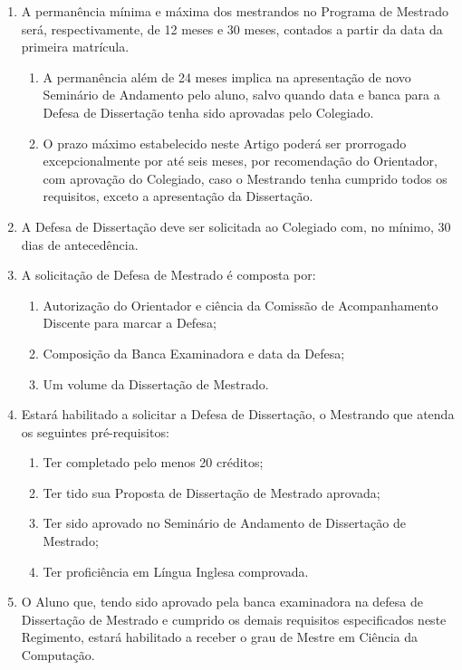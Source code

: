 \documentclass{article}
\newcommand{\grupoMenor}{Colegiado\xspace}
\begin{document}
\begin{enumerate}
	\item A permanência mínima e máxima dos mestrandos no Programa de Mestrado será, respectivamente, de 12 meses e 30 meses, contados a partir da data da primeira matrícula.
	\begin{enumerate}
		\item A permanência além de 24 meses implica na apresentação de novo Seminário de Andamento pelo aluno, salvo quando data e banca para a Defesa de Dissertação tenha sido aprovadas pelo \grupoMenor.	
		\item O prazo máximo estabelecido neste Artigo poderá ser prorrogado excepcionalmente por até seis meses, por recomendação do Orientador, com aprovação do \grupoMenor, caso o Mestrando tenha cumprido todos os requisitos, exceto a apresentação da Dissertação.
	\end{enumerate}

	\item A Defesa de Dissertação deve ser solicitada ao \grupoMenor com, no mínimo, 30 dias de antecedência. 
	\item A solicitação de Defesa de Mestrado é composta por:
    \begin{enumerate}[label=\Roman*]
        \item Autorização do Orientador e ciência da Comissão de Acompanhamento Discente para marcar a Defesa;
        \item Composição da Banca Examinadora e data da Defesa;
        \item Um volume da Dissertação de Mestrado.
    \end{enumerate}
	\item Estará habilitado a solicitar a Defesa de Dissertação, o Mestrando que atenda os seguintes pré-requisitos:
	\begin{enumerate}[label=\Roman*]
		\item 	Ter completado pelo menos 20 créditos;
		\item 	Ter tido sua Proposta de Dissertação de Mestrado aprovada;
		\item 	Ter sido aprovado no Seminário de Andamento de Dissertação de Mestrado;
		\item 	Ter proficiência em Língua Inglesa comprovada.
	\end{enumerate}

	\item O Aluno que, tendo sido aprovado pela banca examinadora na defesa de Dissertação de Mestrado e cumprido os demais requisitos especificados neste Regimento, estará habilitado a receber o grau de Mestre em Ciência da Computação.

\end{enumerate}
\end{document}
